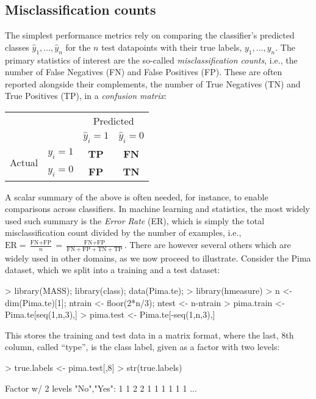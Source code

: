 \documentclass{article}
\begin{document}
\subsection{Misclassification counts}\label{sec:misclasscounts}
The simplest performance metrics rely on comparing the classifier's predicted classes $\hat{y}_1, \dots, \hat{y}_n$ for the $n$ test datapoints with their true labels, $y_1, \dots, y_n$. The primary statistics of interest are the so-called \emph{misclassification counts}, i.e., the number of False Negatives (FN) and False Positives (FP). These are often reported alongside their complements, the number of True Negatives (TN) and True Positives (TP), in a \emph{confusion matrix}:

\begin{center}
\begin{tabular}{cc|c|c}
&&\multicolumn{2}{c}{Predicted} \\
&& $\hat{y}_i = 1$ & $\hat{y}_i = 0$\\\hline
\multirow{2}{*}{Actual} 
& $y_i=1$ & \textbf{TP} & \textbf{FN}  \\\cline{2-4}
& $y_i=0$ & \textbf{FP} & \textbf{TN} 
\end{tabular}
\end{center}
A scalar summary of the above is often needed, for instance, to enable comparisons across classifiers. In machine learning and statistics, the most widely used such summary  is the \emph{Error Rate} (ER), which is simply the total misclassification count divided by the number of examples, i.e., $\text{ER} = \frac{\text{FN}+\text{FP}}{n} = \frac{\text{FN}+\text{FP}}{\text{FN}+\text{FP}+\text{TN}+\text{TP}}$. There are however several others which are widely used in other domains, as we now proceed to illustrate. Consider the Pima dataset, which we split into a training and a test dataset: 
\begin{Schunk}
\begin{Sinput}
> library(MASS); library(class); data(Pima.te); 
> library(hmeasure)
> n <- dim(Pima.te)[1]; ntrain <- floor(2*n/3); ntest <- n-ntrain
> pima.train <- Pima.te[seq(1,n,3),]
> pima.test <- Pima.te[-seq(1,n,3),]
\end{Sinput}
\end{Schunk}
This stores the training and test data in a matrix format, where the last, $8$th column, called ``type'', is the class label, given as a factor with two levels:
\begin{Schunk}
\begin{Sinput}
> true.labels <- pima.test[,8]
> str(true.labels)
\end{Sinput}
\begin{Soutput}
 Factor w/ 2 levels "No","Yes": 1 1 2 2 1 1 1 1 1 1 ...
\end{Soutput}
\end{Schunk}
\end{document}
